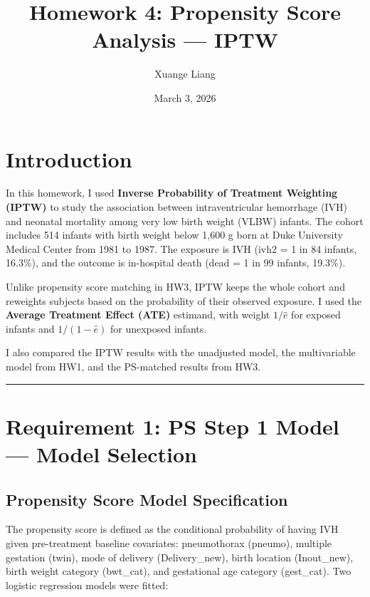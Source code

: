 \documentclass[
]{article}
\title{Homework 4: Propensity Score Analysis --- IPTW}
\author{Xuange Liang}
\date{March 3, 2026}
\let\oldtableofcontents\tableofcontents
\renewcommand{\tableofcontents}{%
    \oldtableofcontents
    \clearpage
  }
\begin{document}
\maketitle

{
\setcounter{tocdepth}{3}
\tableofcontents
}
\hypertarget{introduction}{%
\section{Introduction}\label{introduction}}

In this homework, I used \textbf{Inverse Probability of Treatment
Weighting (IPTW)} to study the association between intraventricular
hemorrhage (IVH) and neonatal mortality among very low birth weight
(VLBW) infants. The cohort includes 514 infants with birth weight below
1,600 g born at Duke University Medical Center from 1981 to 1987. The
exposure is IVH (ivh2 = 1 in 84 infants, 16.3\%), and the outcome is
in-hospital death (dead = 1 in 99 infants, 19.3\%).

Unlike propensity score matching in HW3, IPTW keeps the whole cohort and
reweights subjects based on the probability of their observed exposure.
I used the \textbf{Average Treatment Effect (ATE)} estimand, with weight
\(1/\hat{e}\) for exposed infants and \(1/(1-\hat{e})\) for unexposed
infants.

I also compared the IPTW results with the unadjusted model, the
multivariable model from HW1, and the PS-matched results from HW3.

\begin{center}\rule{0.5\linewidth}{0.5pt}\end{center}

\hypertarget{requirement-1-ps-step-1-model-model-selection}{%
\section{Requirement 1: PS Step 1 Model --- Model
Selection}\label{requirement-1-ps-step-1-model-model-selection}}

\hypertarget{propensity-score-model-specification}{%
\subsection{Propensity Score Model
Specification}\label{propensity-score-model-specification}}

The propensity score is defined as the conditional probability of having
IVH given pre-treatment baseline covariates: pneumothorax (pneumo),
multiple gestation (twin), mode of delivery (Delivery\_new), birth
location (Inout\_new), birth weight category (bwt\_cat), and gestational
age category (gest\_cat). Two logistic regression models were fitted:
\end{document}
